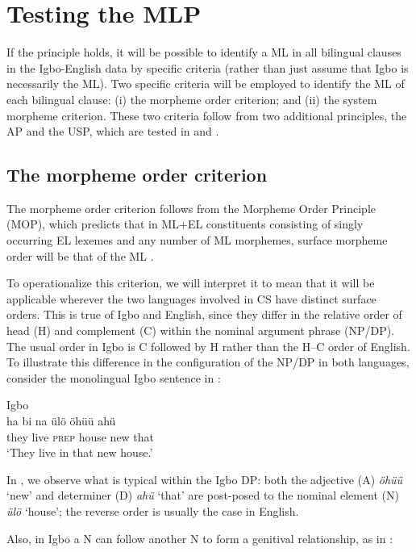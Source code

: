 \documentclass[output=paper]{langsci/langscibook}
\begin{document}
\section{Testing the MLP}\label{sec:ihemere:5}

If the principle holds, it will be possible to identify a ML in all bilingual clauses in the Igbo-English data by specific criteria (rather than just assume that Igbo is necessarily the ML). Two specific criteria will be employed to identify the ML of each bilingual clause: (i) the morpheme order criterion; and (ii) the system morpheme criterion. These two criteria follow from two additional principles, the AP and the USP, which are tested in  and .

\subsection{The morpheme order criterion}\label{sec:ihemere:5.1}

The morpheme order criterion follows from the Morpheme Order Principle (MOP), which predicts that in ML+EL constituents consisting of singly occurring EL lexemes and any number of ML morphemes, surface morpheme order will be that of the ML \citep[59]{MyersScotton2002}. 

To operationalize this criterion, we will interpret it to mean that it will be applicable wherever the two languages involved in CS have distinct surface orders. This is true of Igbo and English, since they differ in the relative order of head (H) and complement (C) within the nominal argument phrase (NP/DP). The usual order in Igbo is C followed by H rather than the H–C order of English. To illustrate this difference in the configuration of the NP/DP in both languages, consider the monolingual Igbo sentence in :

\ea\label{ex:ihemere:9}
{Igbo}\\
\gll ha    bi  na   ülö  öhüü  ahü\\
     they  live  \textsc{prep}  house  new  that\\
\glt ‘They live in that new house.’
\z

In , we observe what is typical within the Igbo DP: both the adjective (A) \textit{öhüü} ‘new’ and determiner (D) \textit{ahü} ‘that’ are post-posed to the nominal element (N) \textit{ülö} ‘house’; the reverse order is usually the case in English. 

Also, in Igbo a N can follow another N to form a genitival relationship, as in : 
\end{document}
